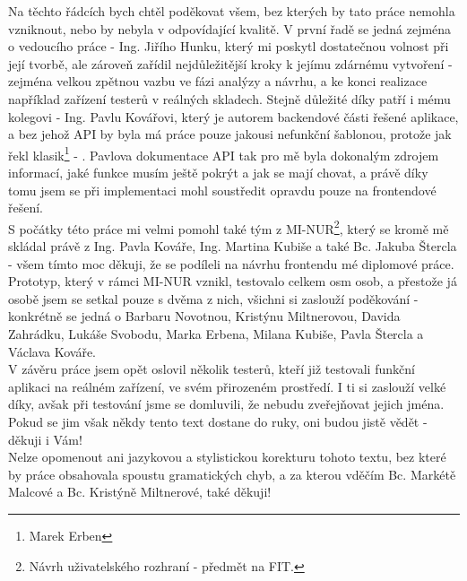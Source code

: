 Na těchto řádcích bych chtěl poděkovat všem, bez kterých by tato práce nemohla vzniknout, nebo by nebyla v odpovídající kvalitě. V první řadě se jedná zejména o vedoucího práce - Ing. Jiřího Hunku, který mi poskytl dostatečnou volnost při její tvorbě, ale zároveň zařídil nejdůležitější kroky k jejímu zdárnému vytvoření - zejména velkou zpětnou vazbu ve fázi analýzy a návrhu, a ke konci realizace například zařízení testerů v reálných skladech. Stejně důležité díky patří i mému kolegovi - Ing. Pavlu Kovářovi, který je autorem backendové části řešené aplikace, a bez jehož API by byla má práce pouze jakousi nefunkční šablonou, protože jak řekl klasik\footnote{Marek Erben} - . Pavlova dokumentace API tak pro mě byla dokonalým zdrojem informací, jaké funkce musím ještě pokrýt a jak se mají chovat, a právě díky tomu jsem se při implementaci mohl soustředit opravdu pouze na frontendové řešení.\\
S počátky této práce mi velmi pomohl také tým z MI-NUR\footnote{Návrh uživatelského rozhraní - předmět na FIT.}, který se kromě mě skládal právě z Ing. Pavla Kováře, Ing. Martina Kubiše a také Bc. Jakuba Štercla - všem tímto moc děkuji, že se podíleli na návrhu frontendu mé diplomové práce. Prototyp, který v rámci MI-NUR vznikl, testovalo celkem osm osob, a přestože já osobě jsem se setkal pouze s dvěma z nich, všichni si zaslouží poděkování - konkrétně se jedná o Barbaru Novotnou, Kristýnu Miltnerovou, Davida Zahrádku, Lukáše Svobodu, Marka Erbena, Milana Kubiše, Pavla Štercla a Václava Kováře.\\
V závěru práce jsem opět oslovil několik testerů, kteří již testovali funkční aplikaci na reálném zařízení, ve svém přirozeném prostředí. I ti si zaslouží velké díky, avšak při testování jsme se domluvili, že nebudu zveřejňovat jejich jména. Pokud se jim však někdy tento text dostane do ruky, oni budou jistě vědět - děkuji i Vám!\\
Nelze opomenout ani jazykovou a stylistickou korekturu tohoto textu, bez které by práce obsahovala spoustu gramatických chyb, a za kterou vděčím Bc. Markétě Malcové a Bc. Kristýně Miltnerové, také děkuji!
